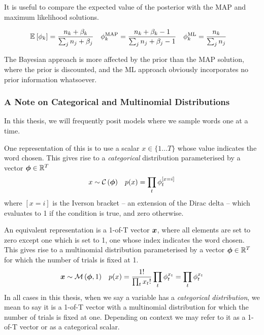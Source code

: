 It is useful to compare the expected value of the posterior with the MAP and maximum likelihood solutions.

\begin{align}
\mathbb{E}_{ {  } }\left[ \phi_k \right]  &= \frac{n_k + \beta_k}{\sum_j n_j + \beta_j} &
\phi_k^{\text{MAP}} &= \frac{n_k + \beta_k - 1}{\sum_j n_j + \beta_j - 1} &
\phi_k^{\text{ML}}  &= \frac{n_k}{\sum_j n_j}
\end{align}

The Bayesian approach is more affected by the prior than the MAP solution, where the prior is discounted, and the ML approach obviously incorporates no prior information whatsoever. 

\subsubsection*{A Note on Categorical and Multinomial Distributions}
In this thesis, we will frequently posit models where we sample words one at a time. 

One representation of this is to use a scalar $x \in \{1 \ldots T\}$ whose value indicates the word chosen. This gives rise to a \emph{categorical} distribution parameterised by a vector $\bm \phi \in { \mathbb{R}^{T} }$
\begin{align}
x &\sim \mathcal{C} \left( {\bm \phi} \right)&
p(x) = \prod_t \phi_t^{[x = i]}
\end{align}
where $[x = i]$ is the Iverson bracket -- an extension of the Dirac delta -- which evaluates to 1 if the condition is true, and zero otherwise. 

An equivalent representation is a 1-of-T vector $\bm x$, where all elements are set to zero except one which is set to 1, one whose index indicates the word chosen. This gives rise to a multinomial distribution parameterised by a vector $\bm \phi \in { \mathbb{R}^{T} }$ for which the number of trials is fixed at 1.
\begin{align}
\bm x &\sim \mathcal{M} \left( {\bm \phi},{1} \right) &
p(x) = \frac{1!}{\prod_t x_t!}\prod_t \phi_t^{x_t} = \prod_t \phi_t^{x_t}
\end{align}
In all cases in this thesis, when we say a variable has a \emph{categorical distribution}, we mean to say it is a 1-of-T vector with a multinomial distribution for which the number of trials is fixed at one. Depending on context we may refer to it as a 1-of-T vector or as a categorical scalar. 

